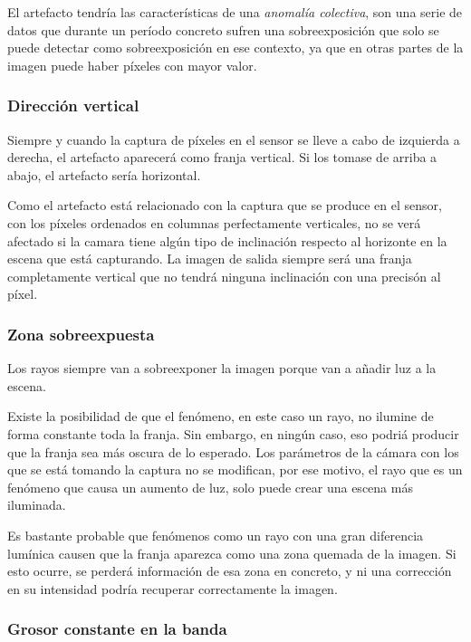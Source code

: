 \documentclass[11pt]{article}
\begin{document}
El artefacto tendría las características de una \emph{anomalía
colectiva}, son una serie de datos que durante un período concreto
sufren una sobreexposición que solo se puede detectar como
sobreexposición en ese contexto, ya que en otras partes de la imagen
puede haber píxeles con mayor valor.

\hypertarget{direcciuxf3n-vertical}{%
\subsubsection{Dirección vertical}\label{direcciuxf3n-vertical}}

Siempre y cuando la captura de píxeles en el sensor se lleve a cabo de
izquierda a derecha, el artefacto aparecerá como franja vertical. Si los
tomase de arriba a abajo, el artefacto sería horizontal.

Como el artefacto está relacionado con la captura que se produce en el
sensor, con los píxeles ordenados en columnas perfectamente verticales,
no se verá afectado si la camara tiene algún tipo de inclinación
respecto al horizonte en la escena que está capturando. La imagen de
salida siempre será una franja completamente vertical que no tendrá
ninguna inclinación con una precisón al píxel.

\hypertarget{zona-sobreexpuesta}{%
\subsubsection{Zona sobreexpuesta}\label{zona-sobreexpuesta}}

Los rayos siempre van a sobreexponer la imagen porque van a añadir luz a
la escena.

Existe la posibilidad de que el fenómeno, en este caso un rayo, no
ilumine de forma constante toda la franja. Sin embargo, en ningún caso,
eso podriá producir que la franja sea más oscura de lo esperado. Los
parámetros de la cámara con los que se está tomando la captura no se
modifican, por ese motivo, el rayo que es un fenómeno que causa un
aumento de luz, solo puede crear una escena más iluminada.

Es bastante probable que fenómenos como un rayo con una gran diferencia
lumínica causen que la franja aparezca como una zona quemada de la
imagen. Si esto ocurre, se perderá información de esa zona en concreto,
y ni una corrección en su intensidad podría recuperar correctamente la
imagen.

\hypertarget{grosor-constante-en-la-banda}{%
\subsubsection{Grosor constante en la
banda}\label{grosor-constante-en-la-banda}}
\end{document}
